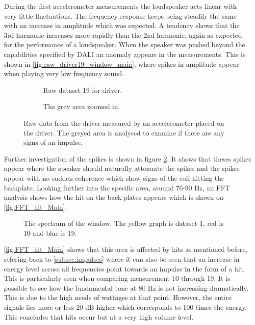 During the first accelerometer measurements the loudspeaker acts linear with very little fluctuations. The frequency response keeps being steadily the same with an increase in amplitude which was expected. A tendency shows that the 3rd harmonic increases more rapidly than the 2nd harmonic, again as expected for the performance of a loudspeaker. When the speaker was pushed beyond the capabilities specified by DALI an anomaly appears in the measurements. This is shown in \autoref{fig:raw_driver19_window_main}, where spikes in amplitude appear when playing very low frequency sound. 

\begin{figure}[H]
\centering
\begin{subfigure}[t]{0.55\textwidth}
	
	\caption{Raw dataset 19 for driver.}
	\label{fig:raw_driver19_window_main}
\end{subfigure}
\begin{subfigure}[t]{0.43\textwidth}
	
	\caption{The grey area zoomed in.}
	\label{fig:raw_driver19_window_zoom_main}
\end{subfigure}
\caption{Raw data from the driver measured by an accelerometer placed on the driver. The greyed area is analysed to examine if there are any signs of an impulse.}
\label{fig:raw_driver19_windows_main}
\end{figure}

Further investigation of the spikes is shown in figure \ref{fig:raw_driver19_window_zoom_main}. It shows that theses spikes appear where the speaker should naturally attenuate the spikes and the spikes appear with no sudden coherence which show signs of the coil hitting the backplate. Looking further into the specific area, around 70-90 Hz, an FFT analysis shows how the hit on the back plates appears which is shown on \autoref{fig:FFT_hit_Main}.

\begin{figure}[H]
\centering
{}

\caption{The spectrum of the window. The yellow graph is dataset 1, red is 10 and blue is 19.}
\label{fig:FFT_hit_Main}
\end{figure}

\autoref{fig:FFT_hit_Main} shows that this area is affected by hits as mentioned before, refering back to \autoref{subsec:impulses} where it can also be seen that an increase in energy level across all frequencies point towards an impulse in the form of a hit. This is particularly seen when comparing measurement 10 through 19. It is possible to see how the fundamental tone at 80 Hz is not increasing dramatically. This is due to the high needs of wattages at that point. However, the entire signals lies more or less 20 dB higher which corresponds to 100 times the energy. This concludes that hits occur but at a very high volume level.




